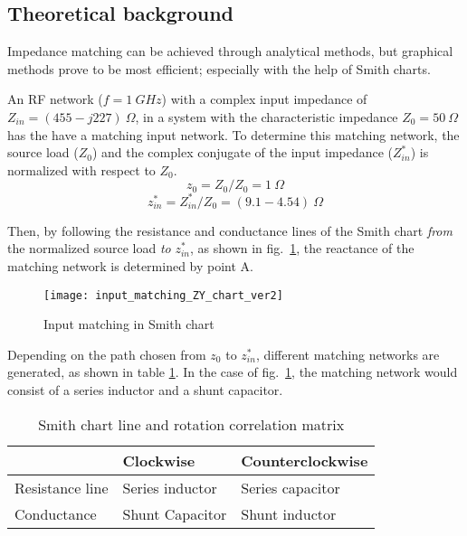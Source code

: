 \documentclass[report.tex]{subfiles}
\begin{document}
\subsection{Theoretical background}

Impedance matching can be achieved through analytical methods, but graphical methods prove to be most efficient; especially  with the help of Smith charts.

An RF network ($f=1~GHz$) with a complex input impedance of $Z_{in}=(455-j227)~\Omega$, in a system with the characteristic impedance $Z_0=50 ~\Omega$ has the have a matching input network. To determine this matching network, the source load ($Z_0$) and the complex conjugate of the input impedance ($Z_{in}^*$) is normalized with respect to $Z_0$.
\begin{equation*}
z_0=Z_0/Z_0 = 1~\Omega
\end{equation*}
\begin{equation*}
z_{in}^*=Z_{in}^*/Z_0=(9.1-4.54)~\Omega
\end{equation*}

Then, by following the resistance and conductance lines of the Smith chart \emph{from} the normalized source load \emph{to} $z_{in}^*$, as shown in fig.~\ref{fig:input_matching_smith_chart}, the reactance of the matching network is determined by point A.

\begin{figure}[h]
    \centering
    \texttt{[image: input\_matching\_ZY\_chart\_ver2]}
    \caption{Input matching in Smith chart}
    \label{fig:input_matching_smith_chart}
\end{figure}

Depending on the path chosen from $z_0$ to $z_{in}^*$, different matching networks are generated, as shown in table \ref{tab:relations}. In the case of fig.~\ref{fig:input_matching_smith_chart}, the matching network would consist of a series inductor and a shunt capacitor.

\begin{table}[h]
\centering
\caption{Smith chart line and rotation correlation matrix}
\label{tab:relations}
\begin{tabular}{l | l l}
                & Clockwise & Counterclockwise \\
\hline
Resistance line & Series inductor   & Series capacitor\\
Conductance     & Shunt Capacitor & Shunt inductor \\
\end{tabular}
\end{table}
\end{document}
